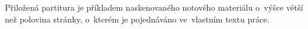 \begin{appendices}
\noindent
Přiložená partitura je příkladem naskenovaného notového materiálu o~výšce
větší než polovina stránky, o~kterém je pojednáváno ve~vlastním textu práce.


\end{appendices}
